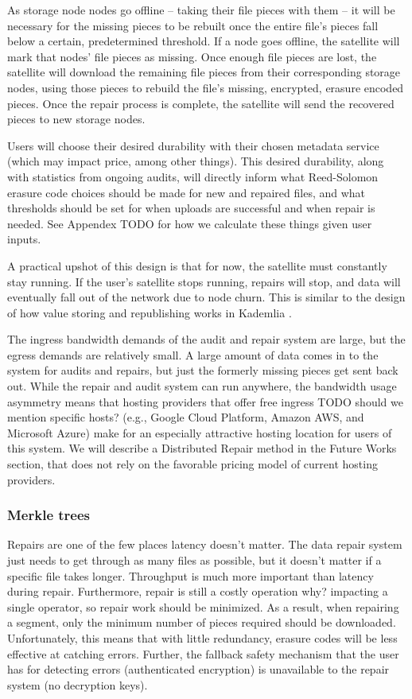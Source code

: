 \documentclass[a4paper,10pt]{article} \usepackage[utf8]{inputenc}
\newcommand{\todo}[1]{{\color{red} TODO #1 }}
\newcommand{\bs}[1]{{\color{red}#1}}
\begin{document}
As storage node nodes go offline -- taking their file pieces with them -- 
it will be 
necessary for the missing pieces to be rebuilt once the entire file's pieces
fall below a certain, predetermined threshold. If a node goes offline, the
satellite will mark that nodes' file pieces as missing. 
Once enough file pieces are lost, the satellite will download the
remaining file pieces from their corresponding storage nodes, using those 
pieces 
to rebuild the file's missing, encrypted, erasure encoded pieces.
Once the repair process is complete, the satellite will send the
recovered pieces to new storage nodes.

Users will choose their desired durability with their chosen metadata service
(which may impact price, among other things). This desired durability, along 
with
statistics from ongoing audits, will directly inform what Reed-Solomon erasure
code choices should be made for new and repaired files, and what thresholds
should be set for when uploads are successful and when repair is needed. See
Appendex \todo{} for how we calculate these things given user inputs.

A practical upshot of this design is that for now, the satellite must
constantly stay running. If the user's satellite stops running, repairs will
stop, and data will eventually fall out of the network due to node churn. This
is similar to the design of how value storing and republishing works in
Kademlia \cite{kad}.

The ingress bandwidth demands of the audit and repair system are large, but the
egress demands are relatively small. A large amount of data comes in to the
system for audits and repairs, but just the formerly missing pieces get sent
back out.
While the repair and audit system can run anywhere, the bandwidth usage
asymmetry means that hosting providers
that offer free ingress \todo{should we mention specific hosts?
(e.g., Google Cloud Platform, Amazon AWS, and Microsoft Azure)}
make for an especially attractive hosting location for users of this system. We will describe a Distributed Repair method in the Future Works section, that does not rely on the favorable pricing model of current hosting providers. 

\subsubsection{Merkle trees}

Repairs are one of the few places latency doesn't matter. The data repair system
just needs to get through as many files as possible, but it doesn't matter if
a specific file takes longer. Throughput is much more important than
latency during repair. Furthermore, repair
is still a costly operation \bs{why?} impacting a single operator, so 
repair work should be minimized. 
As a result, when repairing a segment, 
only the minimum number of pieces required should be downloaded. 
Unfortunately, this means that
with little redundancy, erasure codes will be less effective at catching errors.
Further, the fallback safety mechanism that the user has for detecting errors
(authenticated encryption) is unavailable to the repair system (no decryption
keys).
\end{document}
